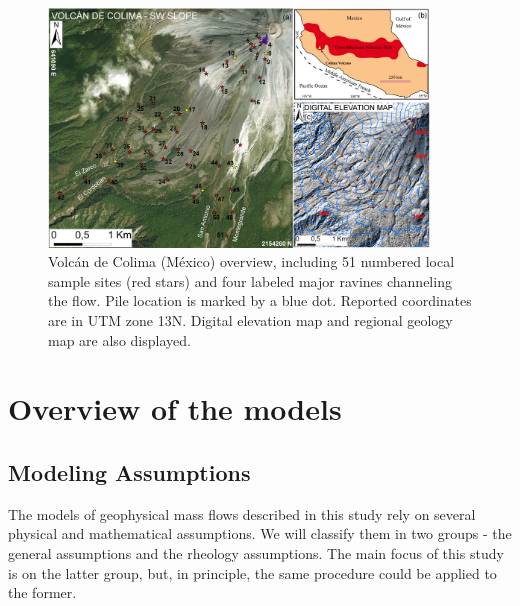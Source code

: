 \documentclass{article}
\begin{document}
\begin{figure}[H]
    \includegraphics[width=0.9\textwidth]{ColimaFig.jpg}
    \centering
    \caption{Volc{\'a}n de Colima (M{\'e}xico) overview, including 51 numbered local sample sites (red stars) and four labeled major ravines channeling the flow. Pile location is marked by a blue dot. Reported coordinates are in UTM zone 13N. Digital elevation map and regional geology map are also displayed.}
    \label{fig:Colima-first}
\end{figure}

\section{Overview of the models}\label{sec:GeoPhFlows}

\subsection{Modeling Assumptions}\label{subsec:ModelAssump}
The models of geophysical mass flows described in this study rely on several physical and mathematical assumptions. We will classify them in two groups - the general assumptions and the rheology assumptions. The main focus of this study is on the latter group, but, in principle, the same procedure could be applied to the former.
\end{document}
